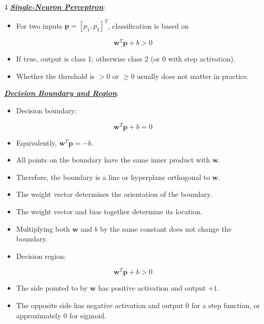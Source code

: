 \documentclass[12pt]{article}
\newcommand{\bulletPoint}[1]{\ul{\textit{\textbf{#1}}}}
\begin{document}
\begin{multicols*}{4}
\bulletPoint{Single-Neuron Perceptron}:
\begin{itemize}
\item For two inputs $\mathbf{p}=[p_1,p_2]^T$, classification is based on
\end{itemize}
\useshortskip
\begin{equation*}
    \mathbf{w}^T\mathbf{p}+b>0
\end{equation*}
\begin{itemize}
\item If true, output is class 1; otherwise class 2 (or 0 with step activation).
\item Whether the threshold is $>0$ or $\ge 0$ usually does not matter in practice.
\end{itemize}

\bulletPoint{Decision Boundary and Region}:
\begin{itemize}
\item Decision boundary:
\end{itemize}
\useshortskip
\begin{equation*}
    \mathbf{w}^T\mathbf{p}+b=0
\end{equation*}
\begin{itemize}
\item Equivalently, $\mathbf{w}^T\mathbf{p}=-b$.
\item All points on the boundary have the same inner product with $\mathbf{w}$.
\item Therefore, the boundary is a line or hyperplane orthogonal to $\mathbf{w}$.
\item The weight vector determines the orientation of the boundary.
\item The weight vector and bias together determine its location.
\item Multiplying both $\mathbf{w}$ and $b$ by the same constant does not change the boundary.
\item Decision region:
\end{itemize}
\useshortskip
\begin{equation*}
    \mathbf{w}^T\mathbf{p}+b>0
\end{equation*}
\begin{itemize}
\item The side pointed to by $\mathbf{w}$ has positive activation and output $+1$.
\item The opposite side has negative activation and output 0 for a step function, or approximately 0 for sigmoid.
\end{itemize}


\end{multicols*}
\end{document}
